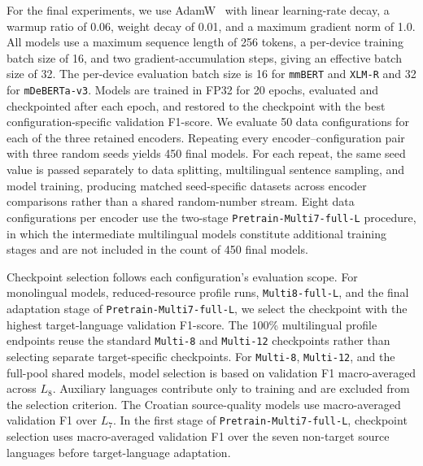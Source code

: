 \documentclass{article}
\begin{document}
For the final experiments, we use AdamW~\parencite{loshchilov2019decoupledweightdecayregularization} with linear learning-rate decay, a warmup ratio of 0.06, weight decay of 0.01, and a maximum gradient norm of 1.0.
All models use a maximum sequence length of 256 tokens, a per-device training batch size of 16, and two gradient-accumulation steps, giving an effective batch size of 32.
The per-device evaluation batch size is 16 for \texttt{mmBERT} and \texttt{XLM-R} and 32 for \texttt{mDeBERTa-v3}.
Models are trained in FP32 for 20 epochs, evaluated and checkpointed after each epoch, and restored to the checkpoint with the best configuration-specific validation F1-score.
We evaluate 50 data configurations for each of the three retained encoders.
Repeating every encoder--configuration pair with three random seeds yields 450 final models.
For each repeat, the same seed value is passed separately to data splitting, multilingual sentence sampling, and model training, producing matched seed-specific datasets across encoder comparisons rather than a shared random-number stream.
Eight data configurations per encoder use the two-stage \texttt{Pretrain-Multi7-full-L} procedure, in which the intermediate multilingual models constitute additional training stages and are not included in the count of 450 final models.

Checkpoint selection follows each configuration's evaluation scope.
For monolingual models, reduced-resource profile runs, \texttt{Multi8-full-L}, and the final adaptation stage of \texttt{Pretrain-Multi7-full-L}, we select the checkpoint with the highest target-language validation F1-score.
The 100\% multilingual profile endpoints reuse the standard \texttt{Multi-8} and \texttt{Multi-12} checkpoints rather than selecting separate target-specific checkpoints.
For \texttt{Multi-8}, \texttt{Multi-12}, and the full-pool shared models, model selection is based on validation F1 macro-averaged across $L_8$.
Auxiliary languages contribute only to training and are excluded from the selection criterion.
The Croatian source-quality models use macro-averaged validation F1 over $L_7$.
In the first stage of \texttt{Pretrain-Multi7-full-L}, checkpoint selection uses macro-averaged validation F1 over the seven non-target source languages before target-language adaptation.
\end{document}
